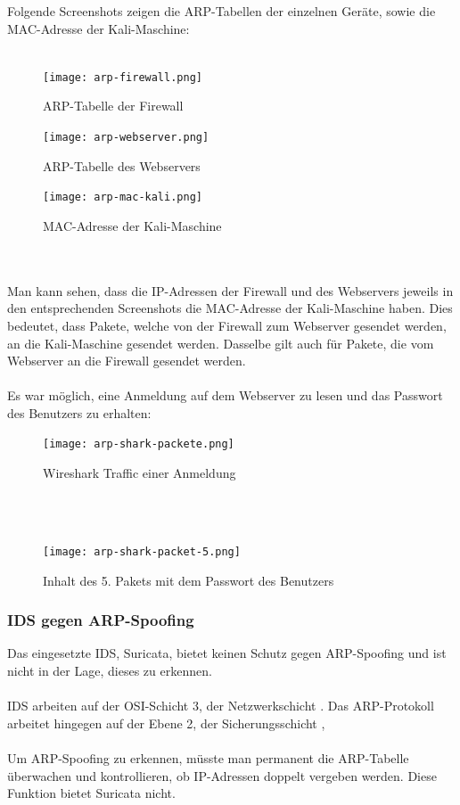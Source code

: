 \documentclass[
    a4paper,
    pagesize,
	pdftex,
    12pt,
]{scrartcl}
\begin{document}
Folgende Screenshots zeigen die ARP-Tabellen der einzelnen Geräte, sowie die MAC-Adresse der Kali-Maschine: \\ \\
\begin{figure}[!ht]
	\centering
	\texttt{[image: arp-firewall.png]}
	\caption{ARP-Tabelle der Firewall}
	\label{fig:arp-firewall}
\end{figure}
\begin{figure}[!ht]
	\centering
	\texttt{[image: arp-webserver.png]}
	\caption{ARP-Tabelle des Webservers}
	\label{fig:arp-webserver}
\end{figure}
\begin{figure}[!ht]
	\centering
	\texttt{[image: arp-mac-kali.png]}
	\caption{MAC-Adresse der Kali-Maschine}
	\label{fig:arp-mac-kali}
\end{figure} 
\\ \\
Man kann sehen, dass die IP-Adressen der Firewall und des Webservers jeweils in den entsprechenden Screenshots die MAC-Adresse der Kali-Maschine haben. Dies bedeutet, dass Pakete, welche von der Firewall zum Webserver gesendet werden, an die Kali-Maschine gesendet werden. Dasselbe gilt auch für Pakete, die vom Webserver an die Firewall gesendet werden.
\\ \\
Es war möglich, eine Anmeldung auf dem Webserver zu lesen und das Passwort des Benutzers zu erhalten:
\begin{figure}[!ht]
	\centering
	\texttt{[image: arp-shark-packete.png]}
	\caption{Wireshark Traffic einer Anmeldung}
	\label{fig:arp-shark-packete.png}
\end{figure}
\\ \\
\begin{figure}[!ht]
	\centering
	\texttt{[image: arp-shark-packet-5.png]}
	\caption{Inhalt des 5. Pakets mit dem Passwort des Benutzers}
	\label{fig:arp-shark-packet-5}
\end{figure} 

\subsubsection{IDS gegen ARP-Spoofing}
Das eingesetzte IDS, Suricata, bietet keinen Schutz gegen ARP-Spoofing und ist nicht in der Lage, dieses zu erkennen. \\ \\
IDS arbeiten auf der OSI-Schicht 3, der Netzwerkschicht \cite{layer-ids}. Das ARP-Protokoll arbeitet hingegen auf der Ebene 2, der Sicherungsschicht \cite{layer-arp},\\ \\
Um ARP-Spoofing zu erkennen, müsste man permanent die ARP-Tabelle überwachen und kontrollieren, ob IP-Adressen doppelt vergeben werden. Diese Funktion bietet Suricata nicht.
\end{document}
